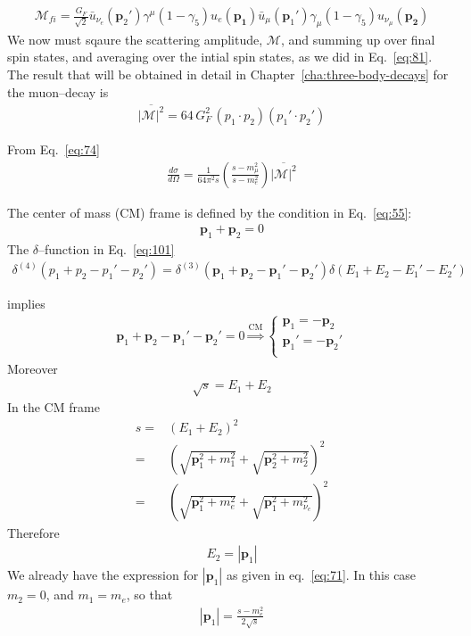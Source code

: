 \begin{align}
  \mathcal{M}_{fi}=\frac{G_F}{\sqrt{2}}
\bar{u}_{\nu_e}(\mathbf{p}_2')\gamma^\mu(1-\gamma_5)u_e(\mathbf{p_1})
\bar{u}_\mu(\mathbf{p}_1')\gamma_\mu(1-\gamma_5)u_{\nu_\mu}(\mathbf{p_2})
\end{align}
We now must sqaure the scattering amplitude, $\mathcal{M}$, and summing up over final spin states, and averaging over the intial spin states, as we did in Eq.~\eqref{eq:81}. The result that will be obtained in detail in Chapter~\ref{cha:three-body-decays} for the muon--decay is
\begin{align}
  \label{eq:102}
  \overline{|\mathcal{M}|^2}=64\,G_F^2\,(p_1\cdot p_2)(p_1'\cdot p_2')
\end{align}

From Eq.~\eqref{eq:74}
\begin{align}
  \label{eq:103}
  \frac{d\sigma}{d\Omega}=\frac{1}{64\pi^2s}\left(\frac{s-m_\mu^2}{s-m_e^2}\right)\overline{|\mathcal{M}|^2}
\end{align}

The center of mass (CM) frame is defined by the condition in Eq.~\eqref{eq:55}:
\begin{align}
  \mathbf{p}_1+\mathbf{p}_2=0
\end{align}
The $\delta$--function in Eq.~\eqref{eq:101}
\begin{align}
  \delta^{(4)}(p_1+p_2-p_1'-p_2')=\delta^{(3)}(\mathbf{p}_1+\mathbf{p}_2-\mathbf{p}_1'-\mathbf{p}_2')
\delta(E_1+E_2-E_1'-E_2')
\end{align}

implies
\begin{align}
  \label{eq:157}
  \mathbf{p}_1+\mathbf{p}_2-\mathbf{p}_1'-\mathbf{p}_2'=0 \overset{\text{CM}}{\Rightarrow}
  \begin{cases}
    \mathbf{p}_1=-\mathbf{p}_2\\
    \mathbf{p}_1'=-\mathbf{p}_2'\\
  \end{cases}
\end{align}
Moreover
\begin{align}
  \sqrt{s}=E_1+E_2
\end{align}
In the CM frame
\begin{align}
\label{eq:104}
s=&\left(E_1+E_2\right)^2\nonumber\\
=&\left(\sqrt{\mathbf{p}_1^2+m_1^2}+\sqrt{\mathbf{p}_2^2+m_2^2}\right)^2\nonumber\\
=&\left(\sqrt{\mathbf{p}_1^2+m_e^2}+\sqrt{\mathbf{p}_1^2+m_{\nu_e}^2}\right)^2
\end{align}
Therefore
\begin{align}
  \label{eq:105}
  E_2=|\mathbf{p}_1|
\end{align}
We already have the expression for $|\mathbf{p}_1|$ as given in eq.~\eqref{eq:71}. In this case $m_2=0$, and $m_1=m_e$, so that
\begin{align}
  \label{eq:158}
  |\mathbf{p}_1|=\frac{s-m_e^2}{2\sqrt{s}}
\end{align}


